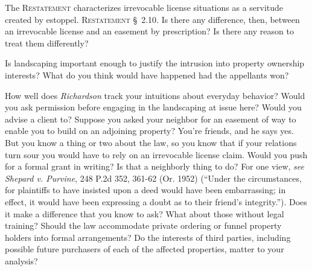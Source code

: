 
\item The \textsc{Restatement} characterizes irrevocable license situations as a
servitude created by estoppel. \textsc{Restatement} \S~2.10. Is there any
difference, then, between an irrevocable license and an easement by
prescription? Is there any reason to treat them differently?


\item Is landscaping important enough to justify the intrusion into property
ownership interests? What do you think would have happened had the appellants
won?


\item How well does \textit{Richardson} track your intuitions about everyday
behavior? Would you ask permission before engaging in the landscaping at issue
here? Would you advise a client to? Suppose you asked your neighbor for an
easement of way to enable you to build on an adjoining property? You're friends,
and he says yes. But you know a thing or two about the law, so you know that if
your relations turn sour you would have to rely on an irrevocable license claim.
Would you push for a formal grant in writing? Is that a neighborly thing to do?
For one view, \textit{see} \emph{Shepard v. Purvine}, 248 P.2d 352, 361-62 (Or.
1952) (``Under the circumstances, for plaintiffs to have insisted upon a deed
would have been embarrassing; in effect, it would have been expressing a doubt
as to their friend's integrity.''). Does it make a difference that you know to
ask? What about those without legal training? Should the law accommodate private
ordering or funnel property holders into formal arrangements? Do the interests
of third parties, including possible future purchasers of each of the affected
properties, matter to your analysis?


